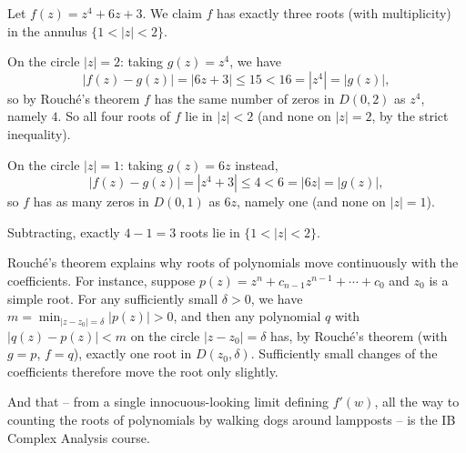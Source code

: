 \begin{example}
    Let $f(z) = z^4 + 6z + 3$. We claim $f$ has exactly three roots (with multiplicity) in the annulus $\{1 < |z| < 2\}$.

    On the circle $|z| = 2$: taking $g(z) = z^4$, we have
    $$
    |f(z) - g(z)| = |6z + 3| \leq 15 < 16 = |z^4| = |g(z)|,
    $$
    so by Rouch\'e's theorem $f$ has the same number of zeros in $D(0, 2)$ as $z^4$, namely $4$. So all four roots of $f$ lie in $|z| < 2$ (and none on $|z| = 2$, by the strict inequality).

    On the circle $|z| = 1$: taking $g(z) = 6z$ instead,
    $$
    |f(z) - g(z)| = |z^4 + 3| \leq 4 < 6 = |6z| = |g(z)|,
    $$
    so $f$ has as many zeros in $D(0, 1)$ as $6z$, namely one (and none on $|z| = 1$).

    Subtracting, exactly $4 - 1 = 3$ roots lie in $\{1 < |z| < 2\}$.
\end{example}

\begin{example}
    Rouch\'e's theorem explains why roots of polynomials move continuously with the coefficients. For instance, suppose $p(z) = z^n + c_{n-1}z^{n-1} + \cdots + c_0$ and $z_0$ is a simple root. For any sufficiently small $\delta > 0$, we have $m = \min_{|z - z_0| = \delta}|p(z)| > 0$, and then any polynomial $q$ with $|q(z) - p(z)| < m$ on the circle $|z - z_0| = \delta$ has, by Rouch\'e's theorem (with $g = p$, $f = q$), exactly one root in $D(z_0, \delta)$. Sufficiently small changes of the coefficients therefore move the root only slightly.
\end{example}

And that -- from a single innocuous-looking limit defining $f'(w)$, all the way to counting the roots of polynomials by walking dogs around lampposts -- is the IB Complex Analysis course.

